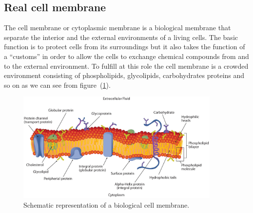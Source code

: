 \subsection{Real cell membrane}
The cell membrane or cytoplasmic membrane is a biological membrane that separate the interior and the external environments of a living cells. The basic function is to protect cells from its surroundings but it also takes the function of a ``customs'' in order to allow the cells to exchange chemical compounds from and to the external environment. To fulfill at this role the cell membrane is a crowded environment consisting of phospholipids, glycolipids, carbohydrates proteins and so on as we can see from figure~(\ref{fig:cellMembrane}).
\begin{figure}[!ht]
	\centering
	\includegraphics[width=0.9\textwidth]{./img/cellMembrane}
	\caption{Schematic representation of a biological cell membrane.}
	\label{fig:cellMembrane}
\end{figure}


